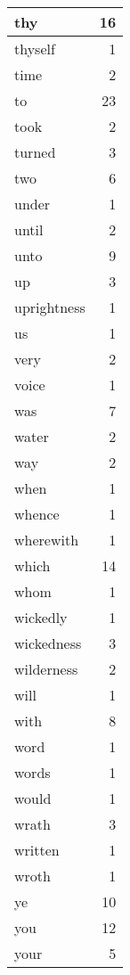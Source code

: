 \begin{center}
\begin{longtable}{l|r}
thy & 16 \\ \hline
thyself & 1 \\ \hline
time & 2 \\ \hline
to & 23 \\ \hline
took & 2 \\ \hline
turned & 3 \\ \hline
two & 6 \\ \hline
under & 1 \\ \hline
until & 2 \\ \hline
unto & 9 \\ \hline
up & 3 \\ \hline
uprightness & 1 \\ \hline
us & 1 \\ \hline
very & 2 \\ \hline
voice & 1 \\ \hline
was & 7 \\ \hline
water & 2 \\ \hline
way & 2 \\ \hline
when & 1 \\ \hline
whence & 1 \\ \hline
wherewith & 1 \\ \hline
which & 14 \\ \hline
whom & 1 \\ \hline
wickedly & 1 \\ \hline
wickedness & 3 \\ \hline
wilderness & 2 \\ \hline
will & 1 \\ \hline
with & 8 \\ \hline
word & 1 \\ \hline
words & 1 \\ \hline
would & 1 \\ \hline
wrath & 3 \\ \hline
written & 1 \\ \hline
wroth & 1 \\ \hline
ye & 10 \\ \hline
you & 12 \\ \hline
your & 5 \\ \hline
\end{longtable}
\end{center}



\normalsize



